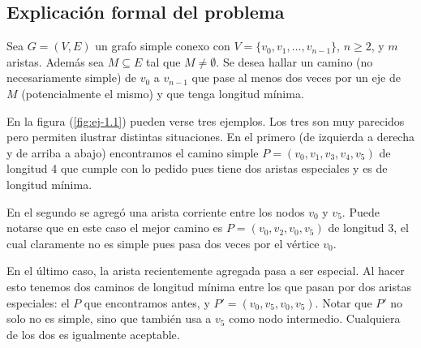 \subsection{Explicación formal del problema}
Sea $G=(V,E)$ un grafo simple conexo con $V=\{v_0, v_1, \dots, v_{n-1}\}$, $n\geq 2$, y $m$ aristas. Además sea $M\subseteq E$ tal que $M\neq \emptyset$. Se desea hallar un camino (no necesariamente simple) de $v_0$ a $v_{n-1}$ que pase al menos dos veces por un eje de $M$ (potencialmente el mismo) y que tenga longitud mínima.

En la figura (\ref{fig:ej-1.1}) pueden verse tres ejemplos. Los tres son muy parecidos pero permiten ilustrar distintas situaciones. En el primero (de izquierda a derecha y de arriba a abajo) encontramos el camino simple $P=(v_0,v_1,v_3,v_4,v_5)$ de longitud 4 que cumple con lo pedido pues tiene dos aristas especiales y es de longitud mínima. 

En el segundo se agregó una arista corriente entre los nodos $v_0$ y $v_5$. Puede notarse que en este caso el mejor camino es $P=(v_0,v_2,v_0,v_5)$ de longitud 3, el cual claramente no es simple pues pasa dos veces por el vértice $v_0$. 

En el último caso, la arista recientemente agregada pasa a ser especial. Al hacer esto tenemos dos caminos de longitud mínima entre los que pasan por dos aristas especiales: el $P$ que encontramos antes, y $P'=(v_0, v_5, v_0, v_5)$. Notar que $P'$ no solo no es simple, sino que también usa a $v_5$ como nodo intermedio. Cualquiera de los dos es igualmente aceptable.


